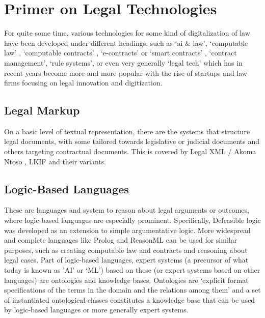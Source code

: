 \documentclass{article}
\begin{document}
\section{Primer on Legal Technologies}
For quite some time, various technologies for some kind of digitalization of law have been developed under different headings, such as ‘ai \& law’, ‘computable law’ , ‘computable contracts’ , ‘e-contracts’  or ‘smart contracts’ , ‘contract management’, ‘rule systems’, or even very generally ‘legal tech’ which has in recent years become more and more popular with the rise of startups and law firms focusing on legal innovation and digitization. 

\subsection{Legal Markup}
On a basic level of textual representation, there are the systems that structure legal documents, with some tailored towards legislative or judicial documents and others targeting contractual %
documents. This is covered by Legal XML \cite{LegalXML} / Akoma Ntoso \cite{akomantosoAkomaNtosoWhat2015}, LKIF \cite{boerMetaLexXMLLegal} and their variants.

\subsection{Logic-Based Languages}
These are languages and system to reason about legal arguments or outcomes, where logic-based languages are especially prominent.
Specifically, Defeasible logic \cite{nute_defeasible_1993,garciaDefeasibleLogicProgramming2002} was developed as an extension to simple argumentative logic. More widespread and complete languages like Prolog \cite{SWIPrologManual} and ReasonML \cite{ReasonReasonLets}  can be used for similar purposes, such as creating computable law and contracts and reasoning about legal cases.
Part of logic-based languages, expert systems (a precursor of what today is known as 'AI’ or ‘ML’) based on these (or expert systems based on other languages) are ontologies and knowledge bases.  Ontologies  are ‘explicit format specifications of the terms in the domain and the relations among them’ \cite{WhatOntologyWhy}   and a set of instantiated ontological classes constitutes a knowledge base that can be used by logic-based languages or more generally expert systems.
\end{document}
